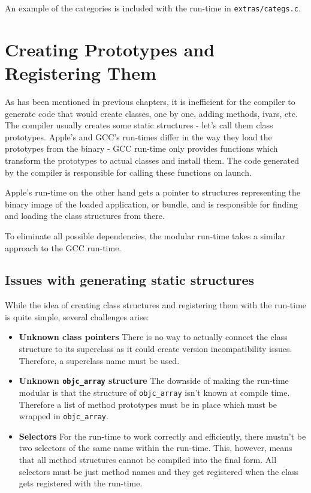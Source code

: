 An example of the categories is included with the run-time in \verb=extras/categs.c=.

\section{Creating Prototypes and Registering Them}

As has been mentioned in previous chapters, it is inefficient for the compiler to generate code that would create classes, one by one, adding methods, ivars, etc. The compiler usually creates some static structures - let's call them class prototypes. Apple's and GCC's run-times differ in the way they load the prototypes from the binary - GCC run-time only provides functions which transform the prototypes to actual classes and install them. The code generated by the compiler is responsible for calling these functions on launch.

Apple's run-time on the other hand gets a pointer to structures representing the binary image of the loaded application, or bundle, and is responsible for finding and loading the class structures from there.

To eliminate all possible dependencies, the modular run-time takes a similar approach to the GCC run-time.

\subsection{Issues with generating static structures}

While the idea of creating class structures and registering them with the run-time is quite simple, several challenges arise:

\begin{itemize}
  \item{\bf{Unknown class pointers}} There is no way to actually connect the class structure to its superclass as it could create version incompatibility issues. Therefore, a superclass name must be used.
  \item{\bf{Unknown \verb=objc_array= structure}} The downside of making the run-time modular is that the structure of \verb=objc_array= isn't known at compile time. Therefore a list of method prototypes must be in place which must be wrapped in \verb=objc_array=.
  \item{\bf{Selectors}} For the run-time to work correctly and efficiently, there mustn't be two selectors of the same name within the run-time. This, however, means that all method structures cannot be compiled into the final form. All selectors must be just method names and they get registered when the class gets registered with the run-time.
\end{itemize}

